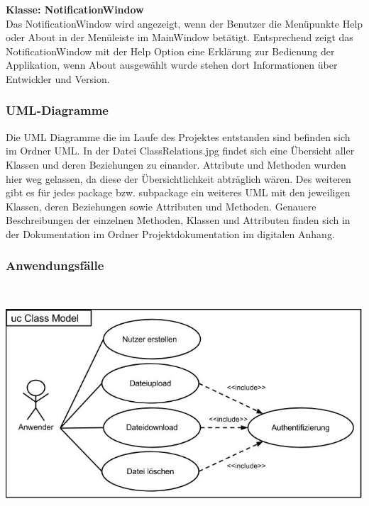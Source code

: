\documentclass[12pt,a4paper,bibliography=totocnumbered,listof=totocnumbered]{scrartcl}
\begin{document}
\textbf{Klasse: NotificationWindow}\\
Das NotificationWindow wird angezeigt, wenn der Benutzer die Menüpunkte Help oder About in der Menüleiste im MainWindow betätigt. Entsprechend zeigt das NotificationWindow mit der Help Option eine Erklärung zur Bedienung der Applikation, wenn About ausgewählt wurde stehen dort Informationen über Entwickler und Version.


\subsubsection{UML-Diagramme}
Die UML Diagramme die im Laufe des Projektes entstanden sind befinden sich im Ordner UML. In der Datei ClassRelations.jpg findet sich eine Übersicht aller Klassen und deren Beziehungen zu einander. Attribute und Methoden wurden hier weg gelassen, da diese der Übersichtlichkeit abträglich wären. Des weiteren gibt es für jedes package bzw. subpackage ein weiteres UML mit den jeweiligen Klassen, deren Beziehungen sowie Attributen und Methoden. Genauere Beschreibungen der einzelnen Methoden, Klassen und Attributen finden sich in der Dokumentation im Ordner Projektdokumentation im digitalen Anhang.

\pagebreak

\subsubsection{Anwendungsfälle}
\vspace{1em}
$\;$\\
\begin{minipage}{\linewidth}
	\centering
	\includegraphics[width=0.8\linewidth]{UseCase.jpg}
\end{minipage}
\vspace{1em}
\end{document}
